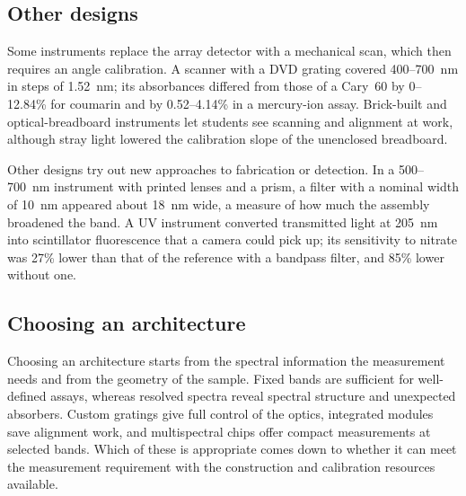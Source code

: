 \subsection{Other designs}

Some instruments replace the array detector with a mechanical scan, which then requires an angle calibration.\citep{gonzalez2020development,zainurin2023developing,hosker2017demonstrating} A scanner with a DVD grating covered 400--700~nm in steps of 1.52~nm; its absorbances differed from those of a Cary~60 by 0--12.84\% for coumarin and by 0.52--4.14\% in a mercury-ion assay.\citep{gonzalez2020development} Brick-built and optical-breadboard instruments let students see scanning and alignment at work,\citep{bougotrobin2016optimization,davis2018open} although stray light lowered the calibration slope of the unenclosed breadboard.\citep{davis2018open}

Other designs try out new approaches to fabrication or detection. In a 500--700~nm instrument with printed lenses and a prism, a filter with a nominal width of 10~nm appeared about 18~nm wide, a measure of how much the assembly broadened the band.\citep{berglund2022enabling} A UV instrument converted transmitted light at 205~nm into scintillator fluorescence that a camera could pick up; its sensitivity to nitrate was 27\% lower than that of the reference with a bandpass filter, and 85\% lower without one.\citep{booysen2021water}

\subsection{Choosing an architecture}

Choosing an architecture starts from the spectral information the measurement needs and from the geometry of the sample. Fixed bands are sufficient for well-defined assays, whereas resolved spectra reveal spectral structure and unexpected absorbers. Custom gratings give full control of the optics, integrated modules save alignment work, and multispectral chips offer compact measurements at selected bands. Which of these is appropriate comes down to whether it can meet the measurement requirement with the construction and calibration resources available.
\FloatBarrier

